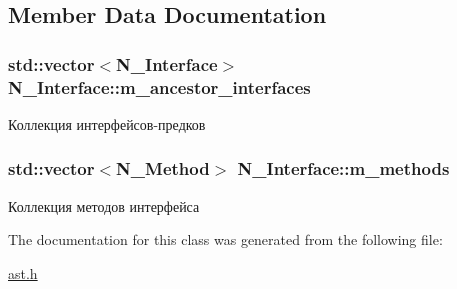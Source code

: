 \subsection{Member Data Documentation}
\hypertarget{classN__Interface_a28ed630cf66d6fba884965c92b608dcd}{}
\subsubsection[{m\+\_\+ancestor\+\_\+interfaces}]{\setlength{\rightskip}{0pt plus 5cm}std\+::vector$<${\bf N\+\_\+\+Interface}$>$ N\+\_\+\+Interface\+::m\+\_\+ancestor\+\_\+interfaces\hspace{0.3cm}{\ttfamily [protected]}}\label{classN__Interface_a28ed630cf66d6fba884965c92b608dcd}


Коллекция интерфейсов-\/предков 

\hypertarget{classN__Interface_a853b6a5a8de7e877facadcd85ea5e496}{}
\subsubsection[{m\+\_\+methods}]{\setlength{\rightskip}{0pt plus 5cm}std\+::vector$<${\bf N\+\_\+\+Method}$>$ N\+\_\+\+Interface\+::m\+\_\+methods\hspace{0.3cm}{\ttfamily [protected]}}\label{classN__Interface_a853b6a5a8de7e877facadcd85ea5e496}


Коллекция методов интерфейса 



The documentation for this class was generated from the following file\+:\begin{DoxyCompactItemize}
\item 
\hyperlink{ast_8h}{ast.\+h}\end{DoxyCompactItemize}
